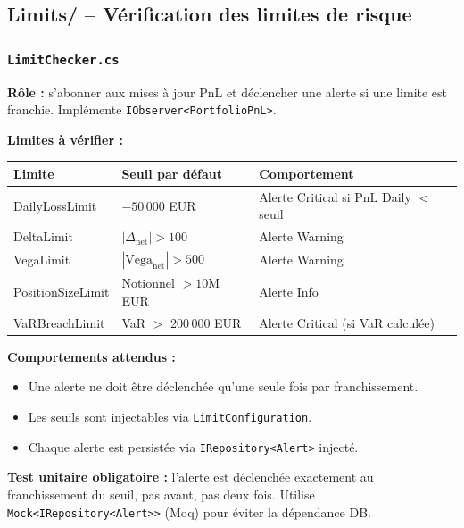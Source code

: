 \documentclass[a4paper,11pt]{article}
\newcommand{\cs}[1]{\texttt{\color{codeinline}#1}}
\begin{document}
\subsection{Limits/ -- V\'erification des limites de risque}

\subsubsection{\texttt{LimitChecker.cs}}

\textbf{R\^ole :} s'abonner aux mises \`a jour PnL et d\'eclencher une alerte si une
limite est franchie. Impl\'emente \cs{IObserver<PortfolioPnL>}.

\textbf{Limites \`a v\'erifier :}

\begin{center}
\begin{tabularx}{\textwidth}{>{\ttfamily}l l X}
\toprule
\textbf{Limite} & \textbf{Seuil par d\'efaut} & \textbf{Comportement} \\
\midrule
DailyLossLimit   & $-50\,000$ EUR              & Alerte Critical si PnL Daily $<$ seuil \\
DeltaLimit       & $|\Delta_{\text{net}}| > 100$ & Alerte Warning \\
VegaLimit        & $|\text{Vega}_{\text{net}}| > 500$ & Alerte Warning \\
PositionSizeLimit & Notionnel $> 10$M EUR      & Alerte Info \\
VaRBreachLimit   & VaR $>$ 200\,000 EUR        & Alerte Critical (si VaR calcul\'ee) \\
\bottomrule
\end{tabularx}
\end{center}

\textbf{Comportements attendus :}
\begin{itemize}[leftmargin=1.5em]
  \item Une alerte ne doit \^etre d\'eclench\'ee qu'une seule fois par franchissement.
  \item Les seuils sont injectables via \cs{LimitConfiguration}.
  \item Chaque alerte est persist\'ee via \cs{IRepository<Alert>} inject\'e.
\end{itemize}

\begin{tcolorbox}[constraint]
\textbf{Test unitaire obligatoire :} l'alerte est d\'eclench\'ee exactement au
franchissement du seuil, pas avant, pas deux fois. Utilise \cs{Mock<IRepository<Alert>>}
(Moq) pour \'eviter la d\'ependance DB.
\end{tcolorbox}
\end{document}
